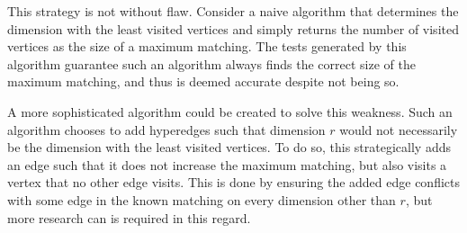 This strategy is not without flaw. Consider a naive algorithm that determines the dimension 
with the least visited vertices and simply returns the number of visited vertices as the
 size of a maximum matching. The tests generated by this algorithm guarantee
 such an algorithm always finds the correct size of the maximum matching, and 
thus is deemed accurate despite not being so. 

A more sophisticated algorithm could be created to solve this weakness. Such an 
algorithm chooses to add hyperedges such that dimension $r$ would not necessarily 
be the dimension with the least visited vertices. To do so, this strategically adds an edge
such that it does not increase the maximum matching, 
but also visits a vertex that no other edge visits. This is done by ensuring the
added edge conflicts with some edge in the known matching on every dimension other than 
$r$, but more research can is required in this regard.